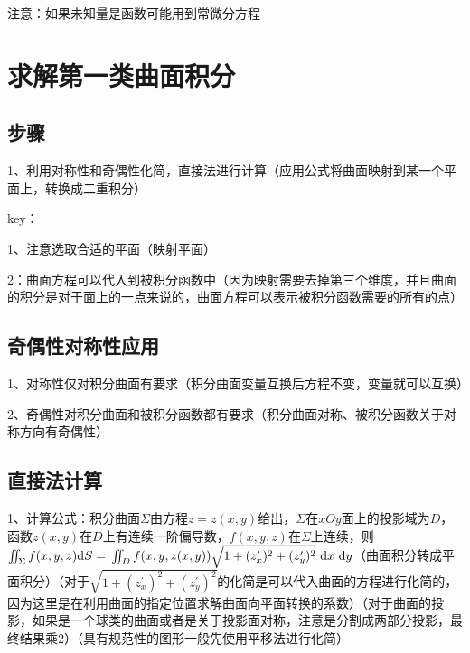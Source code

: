 注意：如果未知量是函数可能用到常微分方程

\section{求解第一类曲面积分}



\subsection{步骤}

1、利用对称性和奇偶性化简，直接法进行计算（应用公式将曲面映射到某一个平面上，转换成二重积分）

key：

1、注意选取合适的平面（映射平面）

2：曲面方程可以代入到被积分函数中（因为映射需要去掉第三个维度，并且曲面的积分是对于面上的一点来说的，曲面方程可以表示被积分函数需要的所有的点）



\subsection{奇偶性对称性应用}

1、对称性仅对积分曲面有要求（积分曲面变量互换后方程不变，变量就可以互换）

2、奇偶性对积分曲面和被积分函数都有要求（积分曲面对称、被积分函数关于对称方向有奇偶性）



\subsection{直接法计算}

1、计算公式：积分曲面$\Sigma$由方程$z=z(x, y)$给出，$\Sigma$在$x O y$面上的投影域为$D$，函数$z(x, y)$在$D$上有连续一阶偏导数，$f(x, y, z)$在$\Sigma$上连续，则$\iint_{\Sigma} f(x, y, z) \mathrm{d} S=\newline\iint_{D} f(x, y, z(x, y)) \sqrt{1+(z_{x}^{\prime})^{2}+(z_{y}^{\prime})^{2}} \mathrm{~d} x \mathrm{~d} y$（曲面积分转成平面积分）（对于$\sqrt{1+\left(z_{x}^{\prime}\right)^{2}+\left(z_{y}^{\prime}\right)^{2}}$的化简是可以代入曲面的方程进行化简的，因为这里是在利用曲面的指定位置求解曲面向平面转换的系数）（对于曲面的投影，如果是一个球类的曲面或者是关于投影面对称，注意是分割成两部分投影，最终结果乘2）（具有规范性的图形一般先使用平移法进行化简）



